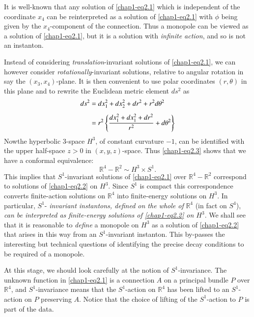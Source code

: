 It is well-known that any solution of \eqref{chap1-eq2.1} which is
independent of the coordinate $x_{4}$ can be reinterpreted as a
solution of \eqref{chap1-eq2.1} with $\phi$ being given by the
$x_{4}$-component of the connection. Thus a monopole can be viewed as
a solution of \eqref{chap1-eq2.1}, but it is a solution with {\em
  infinite action}, and so is not an instanton.

Instead of considering {\em translation}-invariant solutions of
\eqref{chap1-eq2.1}, we can however consider {\em
  rotationally}-invariant solutions, relative to angular rotation in
say the $(x_{3},x_{4})$-plane. It is then convenient to use polar
coordinates $(r,\theta)$ in this plane and to rewrite the Euclidean
metric element $ds^{2}$ as
\begin{align}
ds^{2} &= dx^{2}_{1}+dx^{2}_{2}+dr^{2}+r^{2}d\theta^{2}\notag\\[4pt]
&=
r^{2}\left\{\dfrac{dx^{2}_{1}+dx^{2}_{1}+dr^{2}}{r^{2}}+d\theta^{2}\right\}\label{chap1-eq2.3} 
\end{align}
Now\pageoriginale the hyperbolic 3-space $H^{3}$, of constant
curvature $-1$, can be identified with the upper half-space $z>0$ in
$(x,y,z)$-space. Thus \eqref{chap1-eq2.3} shows that we have a
conformal equivalence:
\begin{equation}
\mathbb{R}^{4}-\mathbb{R}^{2}\sim H^{3}\times S^{1}.\label{chap1-eq2.4}
\end{equation}
This implies that $S^{1}$-invariant solutions of \eqref{chap1-eq2.1}
over $\mathbb{R }^{4}-\mathbb{R}^{2}$ correspond to solutions of
\eqref{chap1-eq2.2} on $H^{3}$. Since $S^{1}$ is compact this
correspondence converts finite-action solutions on $\mathbb{R}^{4}$
into finite-energy solutions on $H^{3}$. In particular, $S^{1}$-{\em
  invariant instantons, defined on the whole of} $\mathbb{R}^{4}$ (in
fact on $S^{4}$), {\em can be interpreted as finite-energy solutions
  of \eqref{chap1-eq2.2} on $H^{3}$}. We shall see that it is
reasonable to {\em define} a monopole on $H^{3}$ as a solution of
\eqref{chap1-eq2.2} that arises in this way from an $S^{1}$-invariant
instanton. This by-passes the interesting but technical questions of
identifying the precise decay conditions to be required of a monopole.

At this stage, we should look carefully at the notion of
$S^{1}$-invariance. The unknown function in \eqref{chap1-eq2.1} is a
connection $A$ on a principal bundle $P$ over $\mathbb{R}^{4}$, and
$S^{1}$-invariance means that the $S^{1}$-action on $\mathbb{R}^{4}$
has been lifted to an $S^{1}$-action on $P$ preserving $A$. Notice
that the choice of lifting of the $S^{1}$-action to $P$ is part of the
data.

